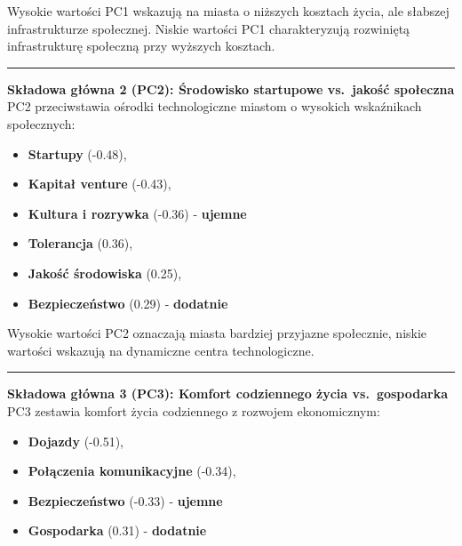 \documentclass[
  12pt,
]{article}
\providecommand{\tightlist}{%
  \setlength{\itemsep}{0pt}\setlength{\parskip}{0pt}}
\begin{document}
Wysokie wartości PC1 wskazują na miasta o niższych kosztach życia, ale
słabszej infrastrukturze społecznej. Niskie wartości PC1 charakteryzują
rozwiniętą infrastrukturę społeczną przy wyższych kosztach.

\begin{center}\rule{0.5\linewidth}{0.5pt}\end{center}

\textbf{Składowa główna 2 (PC2): Środowisko startupowe vs.~jakość
społeczna}\\
PC2 przeciwstawia ośrodki technologiczne miastom o wysokich wskaźnikach
społecznych:

\begin{itemize}
\tightlist
\item
  \textbf{Startupy} (-0.48),\\
\item
  \textbf{Kapitał venture} (-0.43),\\
\item
  \textbf{Kultura i rozrywka} (-0.36) - \textbf{ujemne}\\
\item
  \textbf{Tolerancja} (0.36),\\
\item
  \textbf{Jakość środowiska} (0.25),\\
\item
  \textbf{Bezpieczeństwo} (0.29) - \textbf{dodatnie}
\end{itemize}

Wysokie wartości PC2 oznaczają miasta bardziej przyjazne społecznie,
niskie wartości wskazują na dynamiczne centra technologiczne.

\begin{center}\rule{0.5\linewidth}{0.5pt}\end{center}

\textbf{Składowa główna 3 (PC3): Komfort codziennego życia
vs.~gospodarka}\\
PC3 zestawia komfort życia codziennego z rozwojem ekonomicznym:

\begin{itemize}
\tightlist
\item
  \textbf{Dojazdy} (-0.51),\\
\item
  \textbf{Połączenia komunikacyjne} (-0.34),\\
\item
  \textbf{Bezpieczeństwo} (-0.33) - \textbf{ujemne}\\
\item
  \textbf{Gospodarka} (0.31) - \textbf{dodatnie}
\end{itemize}
\end{document}
